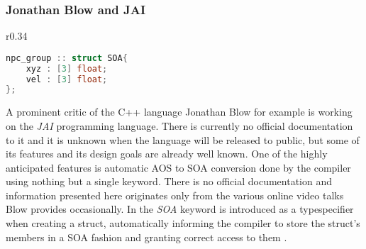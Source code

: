 \subsubsection{Jonathan Blow and JAI}
\begin{wrapfigure}[8]{r}{0.34\textwidth}
\begin{lstlisting}[language=C++,name={JAI's native SOA support},morekeywords={SOA}, label={jai_npc}]
npc_group :: struct SOA{
	xyz : [3] float;
	vel : [3] float;
};
\end{lstlisting}
\end{wrapfigure}
A prominent critic of the C++ language Jonathan Blow for example is working on the \textit{JAI} programming language. There is currently no official documentation to it and it is unknown when the language will be released to public, but some of its features and its design goals are already well known. One of the highly anticipated features is automatic AOS to SOA conversion done by the compiler using nothing but a single keyword. There is no official documentation and information presented here originates only from the various online video talks Blow provides occasionally. In  the \textit{SOA} keyword is introduced as a typespecifier when creating a struct, automatically informing the compiler to store the struct's members in a SOA fashion and granting correct access to them .

